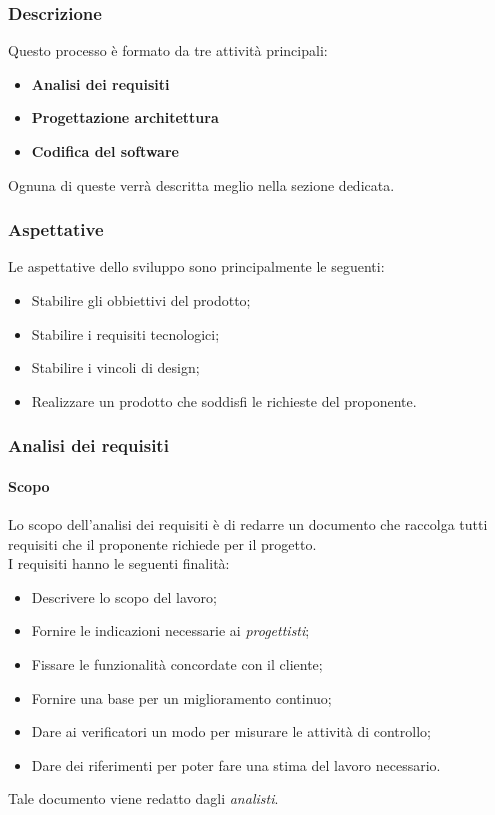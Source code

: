 \documentclass[../norme_di_progetto.tex]{subfiles}
\begin{document}
\subsubsection{Descrizione}

Questo processo è formato da tre attività principali:
\begin{itemize}
    \item \textbf{Analisi dei requisiti}
    \item \textbf{Progettazione architettura}
    \item \textbf{Codifica del software}
\end{itemize}

Ognuna di queste verrà descritta meglio nella sezione dedicata.

\subsubsection{Aspettative}
Le aspettative dello sviluppo sono principalmente le seguenti:
\begin{itemize}

\item Stabilire gli obbiettivi del prodotto;
\item Stabilire i requisiti tecnologici;
\item Stabilire i vincoli di design;
\item Realizzare un prodotto che soddisfi le richieste del proponente.

\end{itemize}

\subsubsection{Analisi dei requisiti}

\paragraph{Scopo}
Lo scopo dell'analisi dei requisiti è di redarre un documento che raccolga tutti requisiti che il proponente richiede per il progetto.\\
I requisiti hanno le seguenti finalità:
\begin{itemize}
    \item Descrivere lo scopo del lavoro;
    \item Fornire le indicazioni necessarie ai \emph{progettisti};
    \item Fissare le funzionalità concordate con il cliente;
    \item Fornire una base per un miglioramento continuo;
    \item Dare ai verificatori un modo per misurare le attività di controllo;
    \item Dare dei riferimenti per poter fare una stima del lavoro necessario.
\end{itemize}
Tale documento viene redatto dagli \emph{analisti}.
\end{document}
